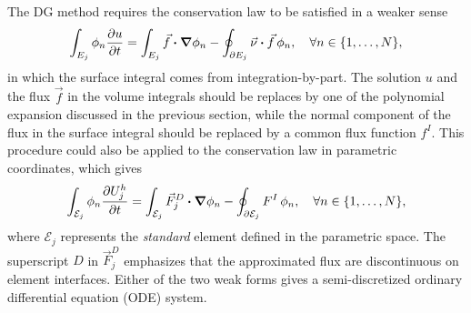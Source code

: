 \documentclass[10pt]{article}
\begin{document}
%
The DG method requires the conservation law to be satisfied in a weaker sense
$$
\int_{E_j}\phi_n\pdv{u}{t}
=\int_{E_j}\vec{f}\vdot\grad\phi_n
-\oint_{\partial E_j}\vec{\nu}\vdot\vec{f}\,\phi_n,\quad \forall n\in\{1,\dots,N\},
$$
in which the surface integral comes from integration-by-part.
%
The solution $u$ and the flux $\vec{f}$ in the volume integrals should be replaces by one of the polynomial expansion discussed in the previous section,
while the normal component of the flux in the surface integral should be replaced by a common flux function $f^{I}$.
%
This procedure could also be applied to the conservation law in parametric coordinates, which gives
$$
\int_{\mathcal{E}_j}\phi_{n}\pdv{U_j^{h}}{t}=\int_{\mathcal{E}_j}\vec{F}_j^{D}\vdot\grad\phi_{n}-\oint_{\partial\mathcal{E}_j}F^{I}\,\phi_{n},\quad\forall n\in\{1,\dots,N\},
$$
where $\mathcal{E}_j$ represents the \emph{standard} element defined in the parametric space.
%
The superscript $D$ in $\vec{F}_j^{D}$ emphasizes that the approximated flux are discontinuous on element interfaces.
%
Either of the two weak forms gives a semi-discretized ordinary differential equation (ODE) system.
\end{document}
